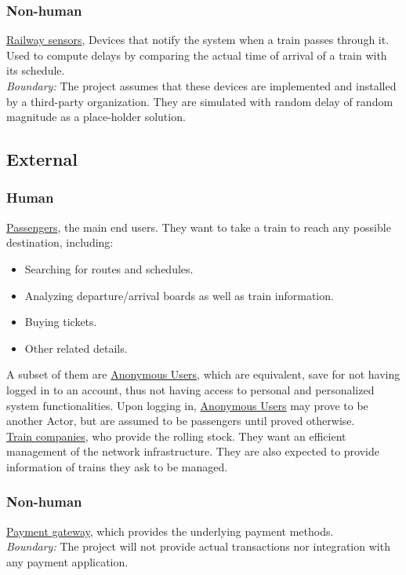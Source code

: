 \documentclass[12pt]{article}
\renewcommand\it[1]{\textit{#1}}
\newcommand\un[1]{\underline{#1}}
\begin{document}
\subsubsection*{Non-human}
\un{Railway sensors}, Devices that notify the system when a train passes through it. Used to compute delays by comparing the 
actual time of arrival of a train with its schedule.\\
\it{Boundary:} The project assumes that these devices are implemented and installed by a third-party organization. They are simulated with random delay of random magnitude as a place-holder solution.

\subsection*{External}

\subsubsection*{Human}
\un{Passengers}, the main end users. They want to take a train to reach any possible destination, including:
\begin{itemize}
	\item Searching for routes and schedules.
	\item Analyzing departure/arrival boards as well as train information.
	\item Buying tickets.
    \item Other related details.
\end{itemize}

A subset of them are \un{Anonymous Users}, which are equivalent, save for not having logged in to an account, thus not having access to personal and personalized system functionalities.
Upon logging in, \un{Anonymous Users} may prove to be another Actor, but are assumed to be passengers until proved otherwise. \\

\noindent\un{Train companies}, who provide the rolling stock. They want an efficient management of the network infrastructure. They are also expected to provide information of trains they ask to be managed.

\subsubsection*{Non-human}
\un{Payment gateway}, which provides the underlying payment methods.\\
\it{Boundary:} The project will not provide actual transactions nor integration with any payment application.
\end{document}
